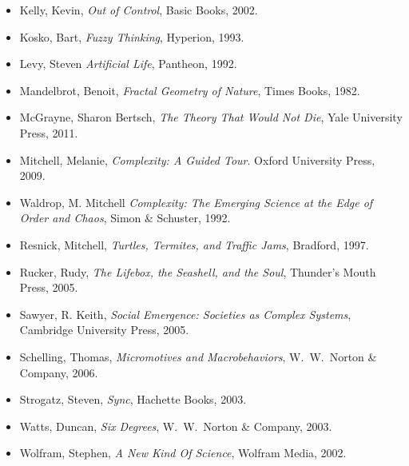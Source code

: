 \documentclass[12pt]{book}
\theoremstyle{exercise}
\newcommand\blankpage{%
    \null
    \thispagestyle{empty}%
    \addtocounter{page}{-1}%
    \newpage}
\begin{document}
\begin{itemize}
\item Kelly, Kevin, {\it  Out of Control},
Basic Books, 2002.

\item Kosko, Bart, {\it Fuzzy Thinking}, 
Hyperion, 1993.

\item Levy, Steven {\it  Artificial Life}, 
Pantheon, 1992.

\item Mandelbrot, Benoit, {\it Fractal Geometry of Nature},
Times Books, 1982.

\item  McGrayne, Sharon Bertsch, {\it The Theory That Would Not Die},
Yale University Press, 2011.

\item Mitchell, Melanie, {\it  Complexity: A Guided Tour}.
Oxford University Press, 2009.

\item Waldrop, M. Mitchell {\it Complexity: The Emerging Science at the Edge of Order and Chaos},
Simon \& Schuster, 1992.

\item Resnick, Mitchell, {\it  Turtles, Termites, and Traffic Jams},
Bradford, 1997.

\item Rucker, Rudy, {\it  The Lifebox, the Seashell, and the Soul},
Thunder's Mouth Press, 2005.

\item Sawyer, R. Keith, {\it  Social Emergence: Societies as Complex Systems},
Cambridge University Press, 2005.

\item Schelling, Thomas, {\it  Micromotives and Macrobehaviors},
W.~W.~Norton \& Company, 2006.

\item Strogatz, Steven, {\it  Sync},
Hachette Books, 2003.

\item Watts, Duncan, {\it  Six Degrees},
W.~W.~Norton \& Company, 2003.

\item Wolfram, Stephen, {\it  A New Kind Of Science},
Wolfram Media, 2002.

\end{itemize}



\backmatter
\printindex

\afterpage{\blankpage}
\end{document}
